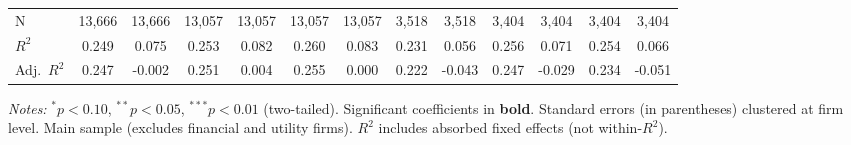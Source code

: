 \documentclass[11pt,a4paper]{article}
\begin{document}
\begin{table}[htbp]
\begin{tabular}{lcccccccccccc}
\midrule
N & 13,666 & 13,666 & 13,057 & 13,057 & 13,057 & 13,057 & 3,518 & 3,518 & 3,404 & 3,404 & 3,404 & 3,404 \\
$R^2$ & 0.249 & 0.075 & 0.253 & 0.082 & 0.260 & 0.083 & 0.231 & 0.056 & 0.256 & 0.071 & 0.254 & 0.066 \\
Adj.~$R^2$ & 0.247 & -0.002 & 0.251 & 0.004 & 0.255 & 0.000 & 0.222 & -0.043 & 0.247 & -0.029 & 0.234 & -0.051 \\
\bottomrule
\end{tabular}
\begin{minipage}{\linewidth}
\vspace{2pt}\scriptsize
\textit{Notes:} $^{*}p<0.10$, $^{**}p<0.05$, $^{***}p<0.01$ (two-tailed).
 Significant coefficients in \textbf{bold}.
 Standard errors (in parentheses) clustered at firm level.
 Main sample (excludes financial and utility firms).
 $R^2$ includes absorbed fixed effects (not within-$R^2$).
\end{minipage}
\end{table}
\clearpage
\end{document}
